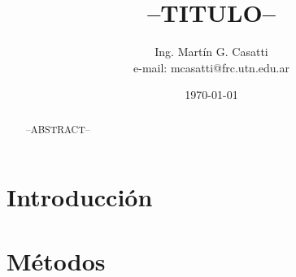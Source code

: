 \documentclass[a4paper,headsepline,footsepline,draft=false]{scrartcl}
\def\borrador{}
\begin{document}
\title{--TITULO--}
\author{Ing. Martín G. Casatti \\ e-mail: mcasatti@frc.utn.edu.ar}
\date{\today}
\maketitle
\thispagestyle{headings}

\begin{abstract}
	--ABSTRACT--
\end{abstract}

%
%
%
%

\section{Introducción}


\section{Métodos}
\end{document}
